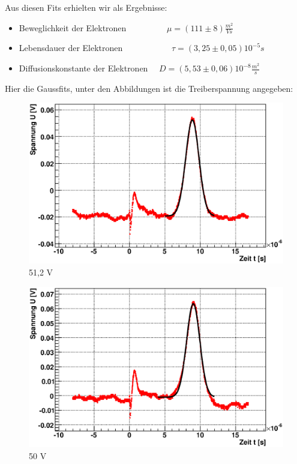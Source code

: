 \documentclass[12pt]{article}
\begin{document}
Aus diesen Fits erhielten wir als Ergebnisse:
\begin{itemize}
 \item Beweglichkeit der Elektronen ~~~~~~~~~$\mu = (111 \pm 8) \frac{m^2}{Vs}$ 
 \item Lebensdauer der Elektronen ~~~~~~~~~~~$\tau = (3,25 \pm 0,05) 10^{-5} s $
 \item Diffusionskonstante der Elektronen ~~$D = (5,53 \pm 0,06) 10^{-8} \frac{m^2}{s}$
\end{itemize}

Hier die Gaussfits, unter den Abbildungen ist die Treiberspannung angegeben:

\begin{figure}[H]  
\begin{minipage}{0.33\linewidth}
\centering
\includegraphics[width=0.9\linewidth]{pictures/varVolt/00.eps}
\small{51,2 V}
\end{minipage}
\begin{minipage}{0.33\linewidth}
\centering
\includegraphics[width=0.9\linewidth]{pictures/varVolt/01.eps}
\small{50 V}
\end{minipage}

\end{figure}
\end{document}
